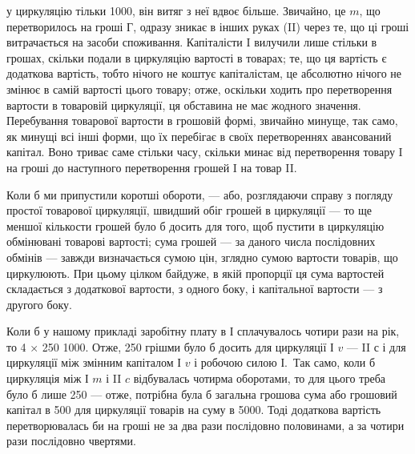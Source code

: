 \parcont{}  %
у циркуляцію тільки 1000, він витяг з неї вдвоє більше. Звичайно,
це $m$, що перетворилось на гроші $Г$, одразу зникає в інших руках
(II) через те, що ці гроші витрачається на засоби споживання. Капіталісти I
вилучили лише стільки в грошах, скільки подали в циркуляцію вартості
в товарах; те, що ця вартість є додаткова вартість, тобто нічого не коштує
капіталістам, це абсолютно нічого не змінює в самій вартості цього товару;
отже, оскільки ходить про перетворення вартости в товаровій циркуляції,
ця обставина не має жодного значення. Перебування товарової вартости
в грошовій формі, звичайно минуще, так само, як минущі всі інші форми,
що їх перебігає в своїх перетвореннях авансований капітал. Воно триває
саме стільки часу, скільки минає від перетворення товару I на гроші до
наступного перетворення грошей I на товар II.

Коли б ми припустили коротші обороти, — або, розглядаючи справу
з погляду простої товарової циркуляції, швидший обіг грошей в циркуляції
— то ще меншої кількости грошей було б досить для того, щоб
пустити в циркуляцію обмінювані товарові вартості; сума грошей — за
даного числа послідовних обмінів — завжди визначається сумою цін, зглядно
сумою вартости товарів, що циркулюють. При цьому цілком байдуже,
в якій пропорції ця сума вартостей складається з додаткової вартости,
з одного боку, і капітальної вартости — з другого боку.

Коли б у нашому прикладі заробітну плату в І сплачувалось чотири
рази на рік, то 4 × 250 \deq{} 1000. Отже, 250 грішми було б
досить для циркуляції І $v$ —  II $с$ і для циркуляції між змінним капіталом
І $v$ і робочою силою І.~Так само, коли б циркуляція між І $m$ і
II $c$ відбувалась чотирма оборотами, то для цього треба було б лише
250 — отже, потрібна була б загальна грошова сума або грошовий
капітал в 500 для циркуляції товарів на суму в 5000.
Тоді додаткова вартість перетворювалась би на гроші не за два рази
послідовно половинами, а за чотири рази послідовно чвертями.

